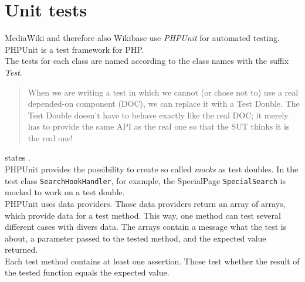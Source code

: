 \section{Unit tests}

MediaWiki and therefore also Wikibase use \textit{PHPUnit} for automated testing. PHPUnit is a test framework for PHP. \\
The tests for each class are named according to the class names with the suffix \textit{Test}. \\
\begin{quote}
 When we are writing a test in which we cannot (or chose not to) use a real depended-on component (DOC), we can replace it with a Test Double. The Test Double doesn't have to behave exactly like the real DOC; it merely has to provide the same API as the real one so that the SUT thinks it is the real one! 
\end{quote}
states \citet{testing}. \\
PHPUnit provides the possibility to create so called \textit{mocks} as test doubles. In the test class \texttt{SearchHookHandler}, for example, the SpecialPage \texttt{SpecialSearch} is mocked to work on a test double. \\
PHPUnit uses data providers. Those data providers return an array of arrays, which provide data for a test method. This way, one method can test several different cases with divers data. The arrays contain a message what the test is about, a parameter passed to the tested method, and the expected value returned. \\
Each test method contains at least one assertion. Those test whether the result of the tested function equals the expected value. 


